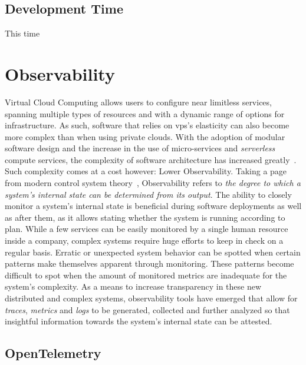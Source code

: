 \subsection{Development Time}
This time

\section{Observability}\label{state-of-the-art:s:observability}

Virtual Cloud Computing allows users to configure near limitless services, spanning multiple types of resources and with a dynamic range of options for infrastructure. As such, software that relies on \gls{vps}'s elasticity can also become more complex than when using private clouds. With the adoption of modular software design and the increase in the use of micro-services and \textit{serverless} compute services, the complexity of software architecture has increased greatly~\Parencite{niedermaier_koetter_freymann_wagner_2019}.
Such complexity comes at a cost however: Lower Observability. Taking a page from modern control system theory~\Parencite{gopal1993modern}, Observability refers to \textit{the degree to which a system's internal state can be determined from its output}. 
The ability to closely monitor a system's internal state is beneficial during software deployments as well as after them, as it allows stating whether the system is running according to plan.
While a few services can be easily monitored by a single human resource inside a company, complex systems require huge efforts to keep in check on a regular basis. 
Erratic or unexpected system behavior can be spotted when certain patterns make themselves apparent through monitoring. These patterns become difficult to spot when the amount of monitored metrics are inadequate for the system's complexity.
As a means to increase transparency in these new distributed and complex systems, observability tools have emerged that allow for \textit{traces}, \textit{metrics} and \textit{logs} to be generated, collected and further analyzed so that insightful information towards the system's internal state can be attested.

\subsection{OpenTelemetry}\label{state-of-the-art:ss:opentelemetry}

